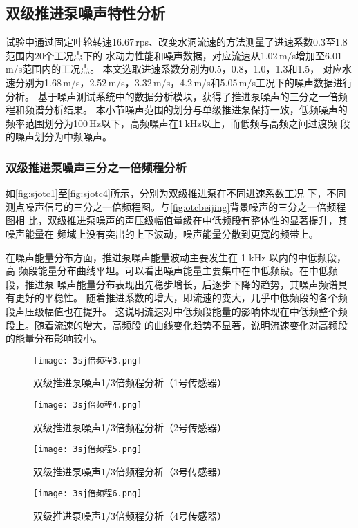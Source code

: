 \subsection{双级推进泵噪声特性分析}
试验中通过固定叶轮转速16.67\,rps、改变水洞流速的方法测量了进速系数0.3至1.8范围内20个工况点下的
水动力性能和噪声数据，对应流速从1.02\,m/s增加至6.01\,m/s范围内的工况点。
本文选取进速系数分别为0.5，0.8，1.0，1.3和1.5，
对应水速分别为1.68\,m/s，2.52\,m/s，3.32\,m/s，4.2\,m/s和5.05\,m/s工况下的噪声数据进行分析。
基于噪声测试系统中的数据分析模块，获得了推进泵噪声的三分之一倍频程和频谱分析结果。
本小节噪声范围的划分与单级推进泵保持一致，低频噪声的频率范围划分为100\,Hz以下，高频噪声在1\,kHz以上，而低频与高频之间过渡频
段的噪声划分为中频噪声。
\subsubsection{双级推进泵噪声三分之一倍频程分析}
如\autoref{fig:sjotc1}至\autoref{fig:sjotc4}所示，分别为双级推进泵在不同进速系数工况
下，不同测点噪声信号的三分之一倍频程图。与\autoref{fig:otcbeijing}背景噪声的三分之一倍频程图相
比，双级推进泵噪声的声压级幅值量级在中低频段有整体性的显著提升，其噪声能量在
频域上没有突出的上下波动，噪声能量分散到更宽的频带上。

在噪声能量分布方面，推进泵噪声能量波动主要发生在 1 kHz 以内的中低频段，高
频段能量分布曲线平坦。可以看出噪声能量主要集中在中低频段。在中低频段，推进泵
噪声能量分布表现出先稳步增长，后逐步下降的趋势，其噪声频谱具有更好的平稳性。
随着推进系数的增大，即流速的变大，几乎中低频段的各个频段声压级幅值也在提升。
这说明流速对中低频段能量的影响体现在中低频整个频段上。随着流速的增大，高频段
的曲线变化趋势不显著，说明流速变化对高频段的能量分布影响较小。
\begin{figure}[htbp]
    \centering
    \texttt{[image: 3sj倍频程3.png]}
    \caption{\label{fig:sjotc1}双级推进泵噪声1/3倍频程分析（1号传感器）}
\end{figure}
\begin{figure}[htbp]
    \centering
    \texttt{[image: 3sj倍频程4.png]}
    \caption{\label{fig:sjotc2}双级推进泵噪声1/3倍频程分析（2号传感器）}
\end{figure}
\begin{figure}[htbp]
    \centering
    \texttt{[image: 3sj倍频程5.png]}
    \caption{\label{fig:sjotc3}双级推进泵噪声1/3倍频程分析（3号传感器）}
\end{figure}
\begin{figure}[htbp]
    \centering
    \texttt{[image: 3sj倍频程6.png]}
    \caption{\label{fig:sjotc4}双级推进泵噪声1/3倍频程分析（4号传感器）}
\end{figure}
